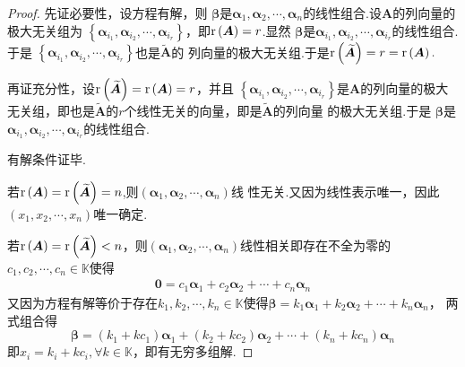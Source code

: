 {\begin{proof}
        先证必要性，设方程有解，则
        $\bm{\beta}$是$\bm{\alpha}_1,
            \bm{\alpha}_2,\cdots,\bm{\alpha}_n$的线性组合.设$\bm{A}$的列向量的极大无关组为
        $\left\{\bm{\alpha}_{i_1},\bm{\alpha}_{i_2}
            ,\cdots,\bm{\alpha}_{i_r}\right\}$，即$\mathrm{r} \left(\bm{A}\right)=r$.显然
        $\bm{\beta}$是$\bm{\alpha}_{i_1},
            \bm{\alpha}_{i_2},\cdots,\bm{\alpha}_{i_r}
        $的线性组合.于是
        $\left\{\bm{\alpha}_{i_1},
            \bm{\alpha}_{i_2},\cdots,\bm{\alpha}_{i_r}
            \right\}$也是$\widetilde{\bm{A}}$的
        列向量的极大无关组.于是$\mathrm{r} \left(\widetilde{\bm{A}}\right)=r=\mathrm{r} \left(\bm{A}\right).$

        再证充分性，设$\mathrm{r} \left(\widetilde{\bm{A}}\right)=
            \mathrm{r} \left(\bm{A}\right)=r$，并且
        $\left\{\bm{\alpha}_{i_1},\bm{\alpha}_{i_2},
            \cdots,\bm{\alpha}_{i_r}\right\}$是$\bm{A}$的列向量的极大无关组，即也是$\widetilde{\bm{A}}$的$
            r$个线性无关的向量，即是$\widetilde{\bm{A}}$的列向量
        的极大无关组.于是
        $\bm{\beta}$是$\bm{\alpha}_{i_1},
            \bm{\alpha}_{i_2},\cdots,\bm{\alpha}_{i_r}
        $的线性组合.

        有解条件证毕.

        若$\mathrm{r} \left(\bm{A}\right)=\mathrm{r} \left(
            \widetilde{\bm{A}}
            \right)=n$,则$\left(\bm{\alpha}_1,
            \bm{\alpha}_2,\cdots,\bm{\alpha}_n\right)$线
        性无关.又因为线性表示唯一，因此$\left(x_1,x_2,\cdots,x_n\right)$唯一确定.

        若$\mathrm{r} \left(\bm{A}\right)=\mathrm{r} \left(
            \widetilde{\bm{A}}
            \right)<n$，则$\left(\bm{\alpha}_1,
            \bm{\alpha}_2,\cdots,\bm{\alpha}_n\right)$线性相关即存在不全为零的$c_1,c_2,\cdots,c_n\in \mathbb{K}$使得
        \begin{align*}
            \bm{0}=c_1\bm{\alpha}_1
            +c_2\bm{\alpha}_2+\cdots+
            c_n\bm{\alpha}_n
        \end{align*}
        又因为方程有解等价于存在$k_1,k_2,\cdots,k_n\in \mathbb{K}$使得$
            \bm{\beta}=k_1\bm{\alpha}_1+k_2\bm{\alpha}_2+\cdots+k_n\bm{\alpha}_n
        $， 两式组合得
        \[
            \bm{\beta}=
            \left(k_1+kc_1\right)\bm{\alpha}_1+\left(
            k_2+kc_2
            \right)\bm{\alpha}_2+\cdots+\left(k_n+kc_n\right)
            \bm{\alpha}_n
        \]
        即$  x_i=k_i+kc_i,\forall k\in \mathbb{K}$，即有无穷多组解.
    \end{proof}
}
